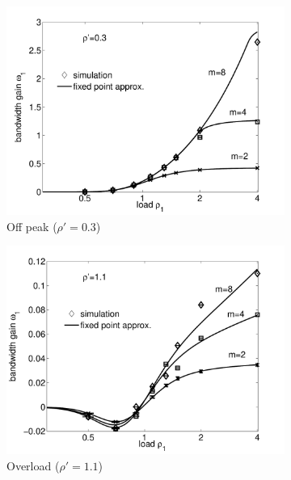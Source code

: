 \begin{figure}[tb]
\centering
\begin{subfigure}{.32\textwidth}
  \centering
  \includegraphics[width=\linewidth]{aggregation/performance_model/figures/fp_bwgain_rho03}
  \caption{Off peak ($\rho'=0.3$)}
  \label{fig:fp_bwgain_rho03}
\end{subfigure}%
\begin{subfigure}{.32\textwidth}
  \centering
  \includegraphics[width=\linewidth]{aggregation/performance_model/figures/fp_bwgain_rho11}
  \caption{Overload ($\rho'=1.1$)}
  \label{fig:fp_bwgain_rho11}
\end{subfigure}
\begin{subfigure}{.32\textwidth}

\end{subfigure}
\end{figure}

